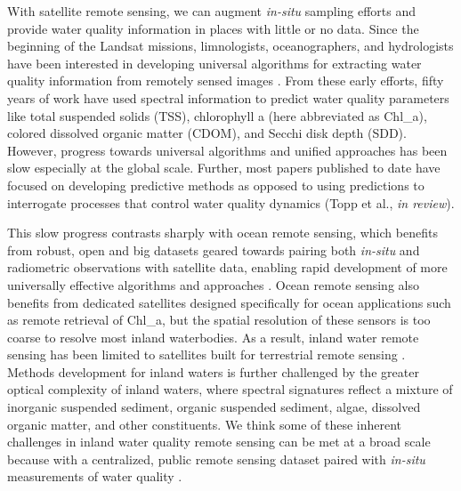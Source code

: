 \documentclass[]{agujournal2018}
\begin{document}
With satellite remote sensing, we can augment \emph{in-situ} sampling
efforts and provide water quality information in places with little or
no data. Since the beginning of the Landsat missions, limnologists,
oceanographers, and hydrologists have been interested in developing
universal algorithms for extracting water quality information from
remotely sensed images
\citep{Clarke1970,Klemas1973,Maul1975,Ritchie1976,Holyer1978}. From
these early efforts, fifty years of work have used spectral information
to predict water quality parameters like total suspended solids (TSS),
chlorophyll a (here abbreviated as Chl\_a), colored dissolved organic
matter (CDOM), and Secchi disk depth (SDD). However, progress towards
universal algorithms and unified approaches has been slow
\citep{Bukata2013,Blondeau-Patissier2014,Palmer2015,Gholizadeh2016}
especially at the global scale. Further, most papers published to date
have focused on developing predictive methods as opposed to using
predictions to interrogate processes that control water quality dynamics
(Topp et al., \emph{in review}).

This slow progress contrasts sharply with ocean remote sensing, which
benefits from robust, open and big datasets geared towards pairing both
\emph{in-situ} and radiometric observations with satellite data,
enabling rapid development of more universally effective algorithms and
approaches \citep{Blondeau-Patissier2014,Bukata2013}. Ocean remote
sensing also benefits from dedicated satellites designed specifically
for ocean applications such as remote retrieval of Chl\_a, but the
spatial resolution of these sensors is too coarse to resolve most inland
waterbodies. As a result, inland water remote sensing has been limited
to satellites built for terrestrial remote sensing \citep{Palmer2015}.
Methods development for inland waters is further challenged by the
greater optical complexity of inland waters, where spectral signatures
reflect a mixture of inorganic suspended sediment, organic suspended
sediment, algae, dissolved organic matter, and other constituents. We
think some of these inherent challenges in inland water quality remote
sensing can be met at a broad scale because with a centralized, public
remote sensing dataset paired with \emph{in-situ} measurements of water
quality \citep{Palmer2015}.
\end{document}
